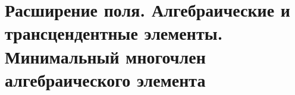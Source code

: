 \section{Расширение поля. Алгебраические и трансцендентные элементы. Минимальный многочлен алгебраического элемента}
